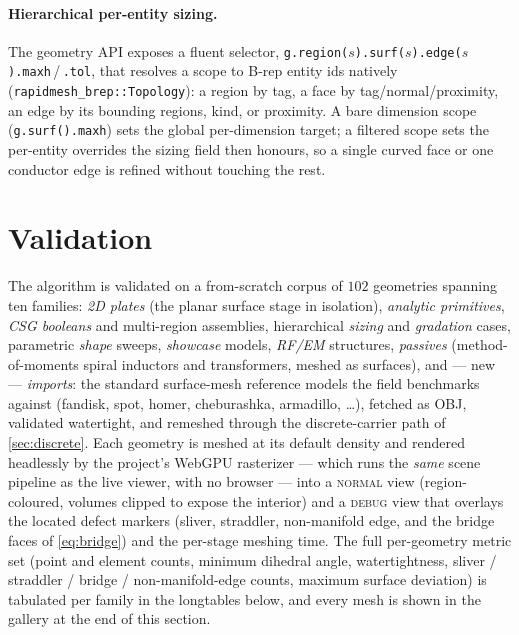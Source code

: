 \documentclass[11pt,a4paper]{article}
\numberwithin{equation}{section}
\DeclareRobustCommand{\code}[1]{\texttt{#1}}
\begin{document}
\paragraph{Hierarchical per-entity sizing.}
The geometry API exposes a fluent selector,
\code{g.region($s$).surf($s$).edge($s$).maxh}\,/\,\code{.tol}, that resolves a
scope to B-rep entity ids natively (\code{rapidmesh\_brep::Topology}): a region by
tag, a face by tag/normal/proximity, an edge by its bounding regions, kind, or
proximity. A bare dimension scope (\code{g.surf().maxh}) sets the global
per-dimension target; a filtered scope sets the per-entity overrides the sizing
field then honours, so a single curved face or one conductor edge is refined
without touching the rest.

\section{Validation}
\label{sec:validation}
The algorithm is validated on a from-scratch corpus of $102$ geometries
spanning ten families: \emph{2D plates} (the planar surface stage in
isolation), \emph{analytic primitives}, \emph{CSG booleans} and multi-region
assemblies, hierarchical \emph{sizing} and \emph{gradation} cases, parametric
\emph{shape} sweeps, \emph{showcase} models, \emph{RF/EM} structures,
\emph{passives} (method-of-moments spiral inductors and transformers, meshed
as surfaces), and --- new --- \emph{imports}: the standard surface-mesh
reference models the field benchmarks against (fandisk, spot, homer,
cheburashka, armadillo, \dots), fetched as OBJ, validated watertight, and
remeshed through the discrete-carrier path of \cref{sec:discrete}. Each
geometry is meshed at its default density and rendered headlessly by the
project's WebGPU rasterizer --- which runs the \emph{same} scene pipeline as
the live viewer, with no browser --- into a \textsc{normal} view
(region-coloured, volumes clipped to expose the interior) and a \textsc{debug}
view that overlays the located defect markers (sliver, straddler,
non-manifold edge, and the bridge faces of \eqref{eq:bridge}) and the
per-stage meshing time. The full per-geometry metric set (point and element
counts, minimum dihedral angle, watertightness, sliver / straddler / bridge /
non-manifold-edge counts, maximum surface deviation) is tabulated per family
in the longtables below, and every mesh is shown in the gallery at the end of
this section.
\end{document}
